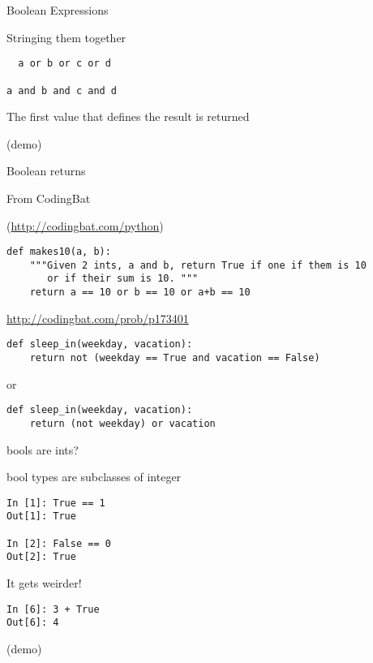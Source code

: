 \documentclass{beamer}
\begin{document}
\begin{frame}[fragile]{Boolean Expressions}

{\Large Stringing them together}

\begin{verbatim}
￼ a or b or c or d

a and b and c and d  
\end{verbatim}

{\Large The first value that defines the result is returned}

\vfill
(demo)
\end{frame}


\begin{frame}[fragile]{Boolean returns}

{\Large From CodingBat}

(\url{http://codingbat.com/python})

\begin{verbatim}
def makes10(a, b):
    """Given 2 ints, a and b, return True if one if them is 10
       or if their sum is 10. """
    return a == 10 or b == 10 or a+b == 10
\end{verbatim}

\vfill
\url{http://codingbat.com/prob/p173401}
\begin{verbatim}
def sleep_in(weekday, vacation):
    return not (weekday == True and vacation == False)
\end{verbatim}
or
\begin{verbatim}
def sleep_in(weekday, vacation):
    return (not weekday) or vacation
\end{verbatim}


\end{frame}


\begin{frame}[fragile]{bools are ints?}

{\Large bool types are subclasses of integer}

\begin{verbatim}
In [1]: True == 1
Out[1]: True

In [2]: False == 0
Out[2]: True  
\end{verbatim}

{\Large It gets weirder! }

\begin{verbatim}
In [6]: 3 + True
Out[6]: 4
\end{verbatim}

(demo)

\end{frame}
\end{document}
